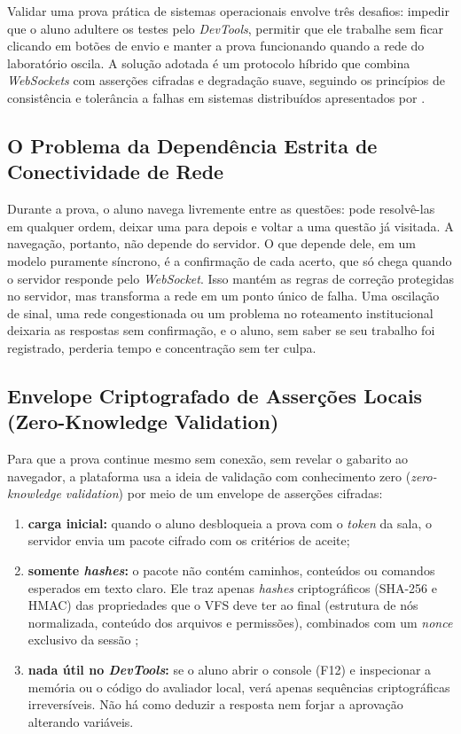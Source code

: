 Validar uma prova prática de sistemas operacionais envolve três desafios: impedir que o aluno adultere os testes pelo \textit{DevTools}, permitir que ele trabalhe sem ficar clicando em botões de envio e manter a prova funcionando quando a rede do laboratório oscila. A solução adotada é um protocolo híbrido que combina \textit{WebSockets} \cite{fette2011websocket} com asserções cifradas e degradação suave, seguindo os princípios de consistência e tolerância a falhas em sistemas distribuídos apresentados por .

\subsection{O Problema da Dependência Estrita de Conectividade de Rede}
\label{sec:dependencia-rede}

Durante a prova, o aluno navega livremente entre as questões: pode resolvê-las em qualquer ordem, deixar uma para depois e voltar a uma questão já visitada. A navegação, portanto, não depende do servidor. O que depende dele, em um modelo puramente síncrono, é a confirmação de cada acerto, que só chega quando o servidor responde pelo \textit{WebSocket}. Isso mantém as regras de correção protegidas no servidor, mas transforma a rede em um ponto único de falha. Uma oscilação de sinal, uma rede congestionada ou um problema no roteamento institucional deixaria as respostas sem confirmação, e o aluno, sem saber se seu trabalho foi registrado, perderia tempo e concentração sem ter culpa.

\subsection{Envelope Criptografado de Asserções Locais (Zero-Knowledge Validation)}
\label{sec:envelope-cifrado}

Para que a prova continue mesmo sem conexão, sem revelar o gabarito ao navegador, a plataforma usa a ideia de validação com conhecimento zero (\textit{zero-knowledge validation}) por meio de um envelope de asserções cifradas:

\begin{enumerate}
    \item \textbf{carga inicial:} quando o aluno desbloqueia a prova com o \textit{token} da sala, o servidor envia um pacote cifrado com os critérios de aceite;
    \item \textbf{somente \textit{hashes}:} o pacote não contém caminhos, conteúdos ou comandos esperados em texto claro. Ele traz apenas \textit{hashes} criptográficos (SHA-256 e HMAC) das propriedades que o VFS deve ter ao final (estrutura de nós normalizada, conteúdo dos arquivos e permissões), combinados com um \textit{nonce} exclusivo da sessão \cite{stallings2017crypto,w3c2017webcrypto};
    \item \textbf{nada útil no \textit{DevTools}:} se o aluno abrir o console (F12) e inspecionar a memória ou o código do avaliador local, verá apenas sequências criptográficas irreversíveis. Não há como deduzir a resposta nem forjar a aprovação alterando variáveis.
\end{enumerate}


